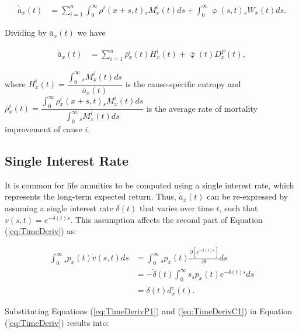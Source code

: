 \documentclass[12pt]{article}
\begin{document}
{\begin{equation}\label{eq:TimeDerivCoD2}
\begin{split}
\dot{\bar{a}} _x(t) &= \sum_{i=1}^{n} \int_0^\infty  \rho^{i}(x+s,t){}_sM^{i}_x(t)ds +\int_0^\infty  \upvarphi(s,t) {}_sW_x(t) ds.
\end{split}
\end{equation}

Dividing by $\bar{a} _x(t)$ we have


\begin{equation}\label{eq:TimeDerivCoD3}
\begin{split}
\acute{\bar{a}} _x(t) &= \sum_{i=1}^{n} \bar{\rho}{^i_x}(t){H}^{i}_x(t)+\bar{\upvarphi}(t){D}{^P_x}(t),
\end{split}
\end{equation}


where ${H}^{i}_x(t)=\dfrac{\int_{0}^{\infty}{}_sM^{i}_x(t)ds}{\bar{a} _x(t)}$ is the cause-specific entropy and $\bar{\rho}{^i_x}(t)=\dfrac{\int_{0}^{\infty}\rho{_x^i}(x+s,t) {}_sM^{i}_x(t)ds}{\int_{0}^{\infty}{}_sM^{i}_x(t)ds}$ is the average rate of mortality improvement of cause $i$.

\subsection{Single Interest Rate}

It is common for life annuities to be computed using a single interest rate, which represents the long-term expected return. Thus, $\acute{\bar{a}}_x(t)$ can be re-expressed by assuming a single interest rate $\delta(t)$ that varies over time $t$, such that $v(s,t) = e^{-\delta(t) s}$. This assumption affects the second part of Equation (\ref{eq:TimeDeriv}) as:


\begin{equation}\label{eq:TimeDerivC1}
\begin{split}
\int_0^\infty {}_s{p}_x(t) \dot{v}(s,t)ds &=\int_0^\infty {}_s{p}_x(t) \frac{\partial \left[ e^{-\delta(t)s} \right]}{\partial t}ds \\
&=-\dot{\delta}(t)\int_0^\infty s  {}_s{p}_x(t) e^{-\delta(t)s} ds \\
&=  \dot{\delta}(t)  d^{c}_x(t).
\end{split}
\end{equation}

Substituting Equations (\ref{eq:TimeDerivP1}) and (\ref{eq:TimeDerivC1}) in Equation (\ref{eq:TimeDeriv}) results into: 


}
\end{document}
